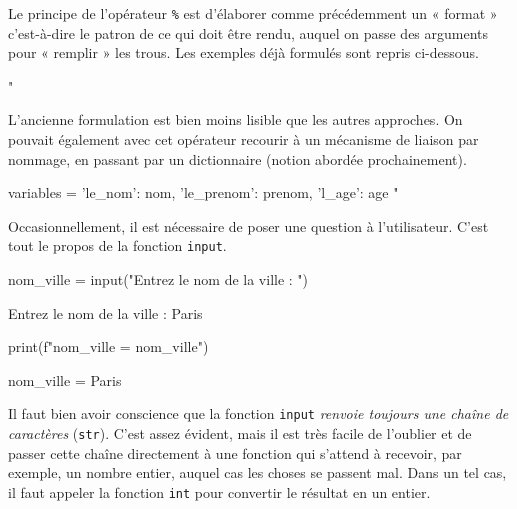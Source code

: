 Le principe de l'opérateur \texttt{\%} est d'élaborer comme précédemment un « format » c'est-à-dire le patron de ce qui doit être rendu, auquel on passe des arguments pour « remplir » les trous. Les exemples déjà formulés sont repris ci-dessous.

\begin{idleconsole}
	\begin{pyconsole}
		"%
	\end{pyconsole}
\end{idleconsole}

L'ancienne formulation est bien moins lisible que les autres approches. On pouvait également avec cet opérateur recourir à un mécanisme de liaison par nommage, en passant par un dictionnaire (notion abordée prochainement).

\begin{idleconsole}
	\begin{pyconsole}
		variables = {'le_nom': nom, 'le_prenom': prenom, 'l_age': age}
		"%
	\end{pyconsole}
\end{idleconsole}

\vspace{1pt}%


Occasionnellement, il est nécessaire de poser une question à l'utilisateur. C'est tout le propos de la fonction \texttt{input}.

\begin{nbjupyterin}[before skip=4pt,after skip=1pt]{1}
nom_ville = input("Entrez le nom de la ville : ")
\end{nbjupyterin}
\begin{nbjupyterout}[after skip=4pt]{1}
Entrez le nom de la ville : Paris
\end{nbjupyterout}
\begin{nbjupyterin}[before skip=4pt,after skip=1pt]{2}
print(f"nom_ville = {nom_ville}")
\end{nbjupyterin}
\begin{nbjupyterout}[after skip=4pt]{2}
nom_ville = Paris
\end{nbjupyterout}

\begin{linewidthnote}
Il faut bien avoir conscience que la fonction \texttt{input} \emph{renvoie toujours une chaîne de caractères} (\texttt{str}). C'est assez évident, mais il est très facile de l'oublier et de passer cette chaîne directement à une fonction qui s'attend à recevoir, par exemple, un nombre entier, auquel cas les choses se passent mal. Dans un tel cas, il faut appeler la fonction \texttt{int} pour convertir le résultat en un entier.
\end{linewidthnote}

